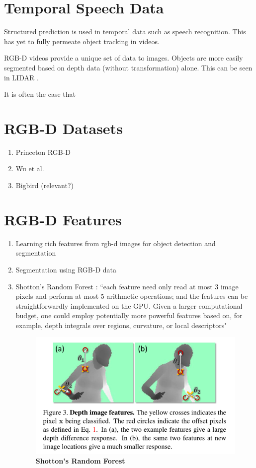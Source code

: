 \section{Temporal Speech Data}
\label{sec:temporalspeech}
Structured prediction is used in temporal data such as speech recognition. This
has yet to fully permeate object tracking in videos.

RGB-D videos provide a unique set of data to images. Objects are more easily
segmented based on depth data (without transformation) alone. This can be seen
in LIDAR \cite{morton2013multi}.

It is often the case that 


\section{RGB-D Datasets}
\begin{enumerate}
\item Princeton RGB-D \cite{song2013tracking}
\item Wu et al. \cite{wu2013online}
\item Bigbird \cite{singh2014bigbird} (relevant?)
\end{enumerate}
\section{RGB-D Features}
\begin{enumerate}
\item Learning rich features from rgb-d images for object detection and segmentation \cite{gupta2014learning}
\item Segmentation using RGB-D data \cite{abramov2012depth}
\item Shotton's Random Forest \cite{shotton2013real}: ``each feature need only
read at most 3 image pixels and perform at most 5 arithmetic
operations; and the features can be straightforwardly implemented
on the GPU. Given a larger computational budget,
one could employ potentially more powerful features based
on, for example, depth integrals over regions, curvature, or
local descriptors"

\begin{figure}
   \hspace{-2mm}
   \includegraphics[width=0.45\linewidth]{figures/shotton2013real_features.png}
   \caption{\textbf{Shotton's Random Forest} \cite{shotton2013real}}
   \label{fig:shotton2013real_features}
\end{figure}
\end{enumerate}

